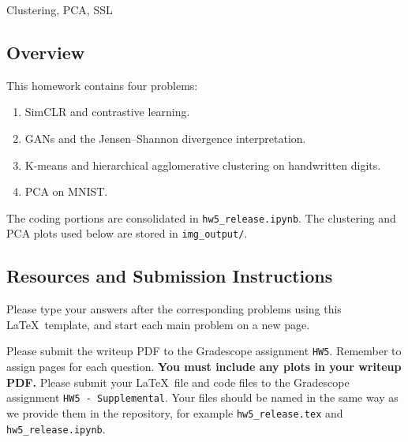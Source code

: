 \documentclass[submit]{../harvardml}
\begin{document}
\begin{center}
{\Large Clustering, PCA, SSL}\\
\end{center}

\subsection*{Overview}
This homework contains four problems:
\begin{enumerate}[leftmargin=*]
    \item SimCLR and contrastive learning.
    \item GANs and the Jensen--Shannon divergence interpretation.
    \item K-means and hierarchical agglomerative clustering on handwritten digits.
    \item PCA on MNIST.
\end{enumerate}
The coding portions are consolidated in \texttt{hw5\_release.ipynb}. The clustering and PCA plots used below are stored in \texttt{img\_output/}.

\subsection*{Resources and Submission Instructions}
Please type your answers after the corresponding problems using this \LaTeX\ template, and start each main problem on a new page.

Please submit the writeup PDF to the Gradescope assignment \texttt{HW5}. Remember to assign pages for each question. \textbf{You must include any plots in your writeup PDF.} Please submit your \LaTeX\ file and code files to the Gradescope assignment \texttt{HW5 - Supplemental}. Your files should be named in the same way as we provide them in the repository, for example \texttt{hw5\_release.tex} and \texttt{hw5\_release.ipynb}.
\end{document}
